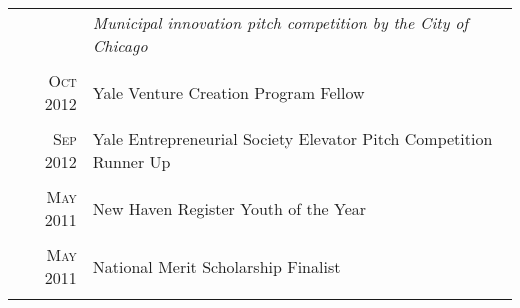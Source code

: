 \documentclass[a4paper,10pt]{article}
\begin{document}
\begin{tabular}{rp{11cm}}
 							    & \small\emph{Municipal innovation pitch competition by the City of Chicago} \\
 \multicolumn{2}{c}{} \\
 \textsc{Oct} 2012 & Yale Venture Creation Program Fellow \\
 \multicolumn{2}{c}{} \\	
 \textsc{Sep} 2012 & Yale Entrepreneurial Society Elevator Pitch Competition Runner Up \\
 \multicolumn{2}{c}{} \\
 \textsc{May} 2011 & New Haven Register Youth of the Year \\
 \multicolumn{2}{c}{} \\
 \textsc{May} 2011 & National Merit Scholarship Finalist \\
 \multicolumn{2}{c}{} \\
\end{tabular}
\end{document}
